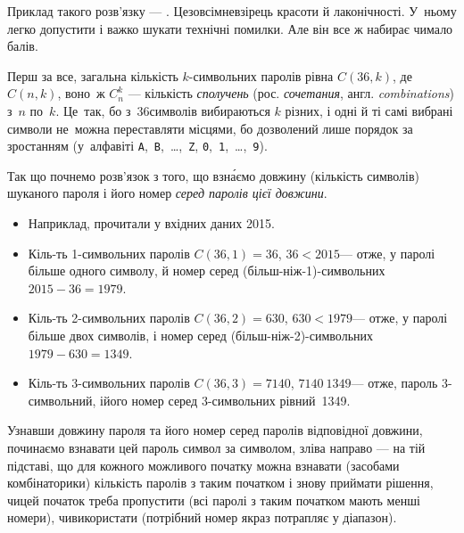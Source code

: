 Приклад такого розв’язку --- .
Це\nolinebreak[2] зовсім\nolinebreak[2] не\nolinebreak[3] взірець красоти й лаконічності. У~ньому легко допустити і важко шукати технічні помилки. Але він все ж набирає чимало балів.

Перш за все, загальна кількість $k$-сим\-воль\-них паролів рівна $C(36, k)$, де $C(n,k)$, воно~ж $C_n^k$ --- кількість \emph{сполучень} (рос. \emph{сочетания}, англ. \emph{combinations}) з~$n$ по~$k$. Це~так, бо з~36\nolinebreak[3] символів вибираються $k$ різних, і одні й ті самі вибрані символи не~можна переставляти місцями, бо дозволений лише порядок за зростанням (у~алфавіті \texttt{A},~\texttt{B},~\dots,~\texttt{Z}, \texttt{0},~\texttt{1},~\dots,~\texttt{9}).

Так що почнемо розв’язок з того, що взн\'{а}ємо довжину (кількість символів) шуканого пароля і його номер \emph{серед паролів цієї довжини}.

\begin{\veryLongExamplesFontSize}
\begin{itemize}[leftmargin=*,itemsep=0pt,partopsep=0pt,topsep=0pt,parsep=0pt]
\item[] Наприклад, прочитали у вхідних даних 2015.

\item Кіль-ть 1-символьних паролів ${C(36,1){=}36}$,\hspace{0.5em plus 1em} ${36{<}2015}$\nolinebreak[3] --- отже, у паролі більше одного символу, й номер серед (більш-ніж-1)-символьних ${2015-36=1979}$.

\item Кіль-ть 2-символьних паролів ${C(36,2){=}630}$,\hspace{0.5em plus 1em} ${630{<}1979}$\nolinebreak[3] --- отже, у паролі більше двох символів, і номер серед (більш-ніж-2)-символьних ${1979-630=1349}$.

\item Кіль-ть 3-символьних паролів ${C(36,3){=}7140}$,\hspace{0.5em plus 1em} ${7140{\>}1349}$\nolinebreak[3] --- отже, пароль 3-символьний, і\nolinebreak[3] його номер серед 3-символьних рівний~1349.

\end{itemize}
\end{\veryLongExamplesFontSize}

Узнавши довжину пароля та його номер серед паролів 
відповідної довжини, починаємо взнавати цей пароль символ за символом, зліва направо --- на тій підставі, що для кожного можливого початку можна взнавати (засобами комбінаторики) 
кількість паролів з таким початком і знову приймати рішення, чи\nolinebreak[3] цей початок треба пропустити (всі паролі з таким початком мають менші номери), чи\nolinebreak[3] використати (потрібний номер якраз потрапляє у діапазон).


